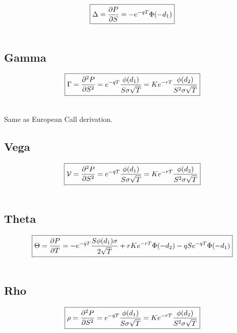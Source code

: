 \documentclass[12pt,a4paper]{article}
\begin{document}
\[
  \boxed{\Delta = \frac{\partial P}{\partial S} = -e^{-qT}\Phi(-d_1)} \\
\]

\[
  \begin{aligned}
  \end{aligned}
\]

\subsection{Gamma}

\[
  \boxed{\Gamma = \frac{\partial^2 P}{\partial S^2} = e^{-qT}\frac{\phi(d_1)}{S\sigma\sqrt{T}} = Ke^{-rT} \frac{\phi(d_2)}{S^2\sigma\sqrt{T}}}\\
\]

\[
  \begin{aligned}
  \end{aligned}
\]

Same as European Call derivation.

\subsection{Vega}

\[
  \boxed{\mathcal{V} = \frac{\partial^2 P}{\partial S^2} = e^{-qT}\frac{\phi(d_1)}{S\sigma\sqrt{T}} = Ke^{-rT} \frac{\phi(d_2)}{S^2\sigma\sqrt{T}}}\\
\]

\[
  \begin{aligned}
  \end{aligned}
\]

\subsection{Theta}

\[
  \boxed{\Theta = \frac{\partial P}{\partial T} = -e^{-qT}\frac{S\phi(d_1)\sigma}{2\sqrt{T}} + rKe^{-rT}\Phi(-d_2) - qSe^{-qT}\Phi(-d_1)}\\
\]


\[
  \begin{aligned}
  \end{aligned}
\]

\subsection{Rho}

\[
  \boxed{\rho = \frac{\partial^2 P}{\partial S^2} = e^{-qT}\frac{\phi(d_1)}{S\sigma\sqrt{T}} = Ke^{-rT} \frac{\phi(d_2)}{S^2\sigma\sqrt{T}}}\\
\]
\end{document}
